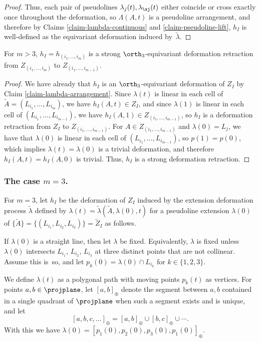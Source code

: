 \begin{proof}
Thus, each pair of pseudolines $\lambda_j(t),\lambda_\xj(t)$ either coincide or cross exactly once throughout the deformation, so $\Lambda(A,t)$ is a pseudoline arrangement, and therefore by Claims \ref{claim-lambda-continuous} and \ref{claim-pseudoline-lift}, $h_I$ is well-defined as the equivariant deformation induced by~$\tilde\lambda$.
\end{proof}

\begin{claim}\label{claim-deform-h}
For $m >3$, $h_I = h_{(i_1,\dots,i_m)}$ is a strong $\orth_3$-equivariant deformation retraction from $Z_{(i_1,\dots,i_m)}$ to $Z_{(i_1,\dots,i_{m-1})}$.
\end{claim}

\begin{proof}
We have already that $h_I$ is an $\orth_3$-equivariant deformation of $Z_I$ by Claim \ref{claim-lambda-arrangement}.
Since $\lambda(t)$ is linear in each cell of $\tilde A = (L_{i_1},\dots,L_{i_{m}})$, we have $h_I(A,t) \in Z_I$,
and since $\lambda(1)$ is linear in each cell of $(L_{i_1},\dots,L_{i_{m-1}})$, we have $h_I(A,1) \in Z_{(i_1,\dots,i_{m-1})}$,
so $h_I$ is a deformation retraction from $Z_I$ to $Z_{(i_1,\dots,i_{m-1})}$.
For $A \in Z_{(i_1,\dots,i_{m-1})}$ and $\lambda(0) = L_j$, we have that $\lambda(0)$ is linear in each cell of $(L_{i_1},\dots,L_{i_{m-1}})$, so $p(1) = p(0)$, which implies $\lambda(t) = \lambda(0)$ is a trivial deformation, and therefore $h_I(A,t) = h_I(A,0)$ is trivial. Thus, $h_I$ is a strong deformation retraction.
\end{proof}

\subsubsection*{The case $m=3$.}
For $m=3$, let $h_I$ be the deformation of $Z_I$ induced by the extension deformation process $\tilde \lambda$ defined by $\lambda(t) = \tilde \lambda(\tilde A, \lambda(0), t)$
for a pseudoline extension $\lambda(0)$ of $\{\tilde A\} = \{(L_{i_1},L_{i_2},L_{i_3})\} = \tilde Z_{I}$ as follows.

If $\lambda(0)$ is a straight line,
then let $\lambda$ be fixed.
Equivalently, $\lambda$ is fixed unless $\lambda(0)$ intersects $L_{i_1}$, $L_{i_2}$, $L_{i_3}$ at three distinct points that are not collinear.
Assume this is~so, and let $p_k(0) = \lambda(0) \cap L_{i_k}$ for $k \in \{1,2,3\}$.

We define $\lambda(t)$ as a polygonal path with moving points $p_k(t)$ as vertices.
For points $a,b \in \projplane$, let $[a,b]_\oplus$ denote the segment between $a,b$ contained in a single quadrant of $\projplane$ when such a segment exists and is unique, and let
\[
[a,b,c,\dots]_\oplus = [a,b]_\oplus \cup [b,c]_\oplus \cup \cdots.
\]
With this we have $\lambda(0) = [p_1(0),p_2(0),p_3(0),p_1(0)]_{\oplus}$.

